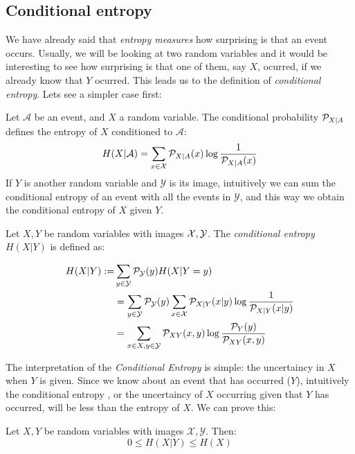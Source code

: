 \subsection*{Conditional entropy}
We have already said that \emph{entropy measures} how surprising is that an event occurs. Usually, we will be looking at two random variables and it would be interesting to see how surprising is that one of them, say $X$, ocurred, if we already know that $Y$ ocurred. This leads us to the definition of \emph{conditional entropy}. Lets see a simpler case first:

Let $\mathcal A$ be an event, and $X$ a random variable. The conditional probability $\mathcal{P}_{X|A}$ defines the entropy of $X$ conditioned to $\mathcal A$:
$$
H(X|\mathcal A) = \sum_{x \in \mathcal{X}} \mathcal{P}_{X|A}(x) \log\frac{1}{\mathcal{P}_{X|A}(x)}
$$
If $Y$ is another random variable and $\mathcal Y$ is its image, intuitively we can sum the conditional entropy of an event with all the events in $\mathcal Y$, and this way we obtain the conditional entropy of $X$ given $Y$.
\begin{ndef}
Let $X,Y$ be random variables with images $\mathcal{X},\mathcal Y$. The \emph{conditional entropy} $H(X | Y)$ is defined as:

\begin{equation*}
        \begin{split}
    H(X|Y) :=  & \sum_{y \in \mathcal Y} \mathcal{P}_{\mathcal Y}(y) H(X| Y = y)  \\ 
    & = \sum_{y \in \mathcal Y} \mathcal{P}_{\mathcal  Y}(y) \sum_{x \in \mathcal{X}} \mathcal{P}_{X | Y}(x|y)\log\frac{1}{\mathcal{P}_{X|Y}(x|y)}  \\
   & = \sum_{x \in X,y \in \mathcal Y}\mathcal{P}_{XY}(x,y)\log\frac{\mathcal{P}_Y(y)}{\mathcal{P}_{XY}(x,y)}
\end{split}
\end{equation*}



\end{ndef}
The interpretation of the \emph{Conditional Entropy} is simple: the uncertaincy in $X$ when $Y$ is given. Since we know about an event that has occurred ($Y$), intuitively the conditional entropy , or the uncertaincy of $X$ occurring given that $Y$ has occurred, will be less than the entropy of $X$. We can prove this:

\begin{nprop}
Let $X,Y$ be random variables with images $\mathcal X, \mathcal Y$. Then:
$$
0 \leq H(X|Y) \leq H(X)
$$
\end{nprop}


